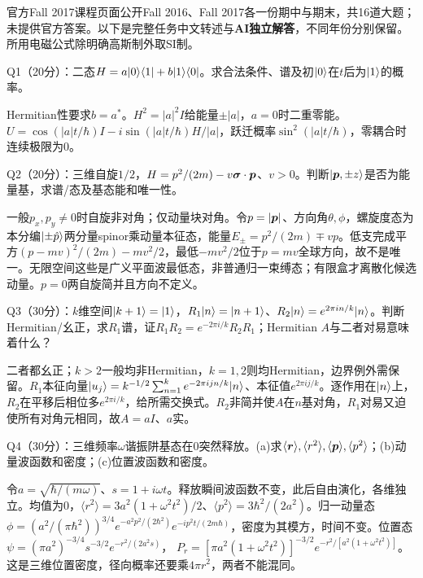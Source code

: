 官方Fall 2017课程页面公开Fall 2016、Fall 2017各一份期中与期末，共16道大题；未提供官方答案。以下是完整任务中文转述与\textbf{AI独立解答}，不同年份分别保留。所用电磁公式除明确高斯制外取SI制。

\begin{exercise}
Q1（20分）：二态$H=a\lvert 0\rangle\langle 1\rvert+b\lvert 1\rangle\langle 0\rvert$。求合法条件、谱及初$\lvert 0\rangle$在$t$后为$\lvert 1\rangle$的概率。
\end{exercise}
\begin{solution}
Hermitian性要求$b=a^*$。$H^2=|a|^2I$给能量$\pm|a|$，$a=0$时二重零能。$U=\cos(|a|t/\hbar)I-i\sin(|a|t/\hbar)H/|a|$，跃迁概率$\sin^2(|a|t/\hbar)$，零耦合时连续极限为0。
\end{solution}
\begin{exercise}
Q2（20分）：三维自旋$1/2$，$H=p^2/(2m)-v\boldsymbol{\sigma}\cdot\boldsymbol{p}$、$v>0$。判断$\lvert \boldsymbol{p},\pm z\rangle$是否为能量基，求谱/态及基态能和唯一性。
\end{exercise}
\begin{solution}
一般$p_x,p_y\ne0$时自旋非对角；仅动量块对角。令$p=|\boldsymbol{p}|$、方向角$\theta,\phi$，螺旋度态为本分编$\lvert \pm\hat p\rangle$两分量spinor乘动量本征态，能量$E_\pm=p^2/(2m)\mp vp$。低支完成平方$(p-mv)^2/(2m)-mv^2/2$，最低$-mv^2/2$位于$p=mv$全球方向，故不是唯一。无限空间这些是广义平面波最低态，非普通归一束缚态；有限盒才离散化候选动量。$p=0$两自旋简并且方向不定义。
\end{solution}

\begin{exercise}
Q3（30分）：$k$维空间$\lvert k+1\rangle=\lvert 1\rangle$，$R_1\lvert n\rangle=\lvert n+1\rangle$、$R_2\lvert n\rangle=e^{2\pi in/k}\lvert n\rangle$。判断Hermitian/幺正，求$R_1$谱，证$R_1R_2=e^{-2\pi i/k}R_2R_1$；Hermitian $A$与二者对易意味着什么？
\end{exercise}
\begin{solution}
二者都幺正；$k>2$一般均非Hermitian，$k=1,2$则均Hermitian，边界例外需保留。$R_1$本征向量$\lvert u_j\rangle=k^{-1/2}\sum_{n=1}^ke^{-2\pi ijn/k}\lvert n\rangle$、本征值$e^{2\pi ij/k}$。逐作用在$\lvert n\rangle$上，$R_2$在平移后相位多$e^{2\pi i/k}$，给所需交换式。$R_2$非简并使$A$在$n$基对角，$R_1$对易又迫使所有对角元相同，故$A=aI$、$a$实。
\end{solution}
\begin{exercise}
Q4（30分）：三维频率$\omega$谐振阱基态在0突然释放。(a)求$\langle\boldsymbol{r}\rangle,\langle r^2\rangle,\langle\boldsymbol{p}\rangle,\langle p^2\rangle$；(b)动量波函数和密度；(c)位置波函数和密度。
\end{exercise}
\begin{solution}
令$a=\sqrt{\hbar/(m\omega)}$、$s=1+i\omega t$。释放瞬间波函数不变，此后自由演化，各维独立。均值为0，$\langle r^2\rangle=3a^2(1+\omega^2t^2)/2$、$\langle p^2\rangle=3\hbar^2/(2a^2)$。归一动量态
$\phi=(a^2/(\pi\hbar^2))^{3/4}e^{-a^2p^2/(2\hbar^2)}e^{-ip^2t/(2m\hbar)}$，密度为其模方，时间不变。位置态
$\psi=(\pi a^2)^{-3/4}s^{-3/2}e^{-r^2/(2a^2s)}$，
$P_r=[\pi a^2(1+\omega^2t^2)]^{-3/2}e^{-r^2/[a^2(1+\omega^2t^2)]}$。这是三维位置密度，径向概率还要乘$4\pi r^2$，两者不能混同。
\end{solution}

